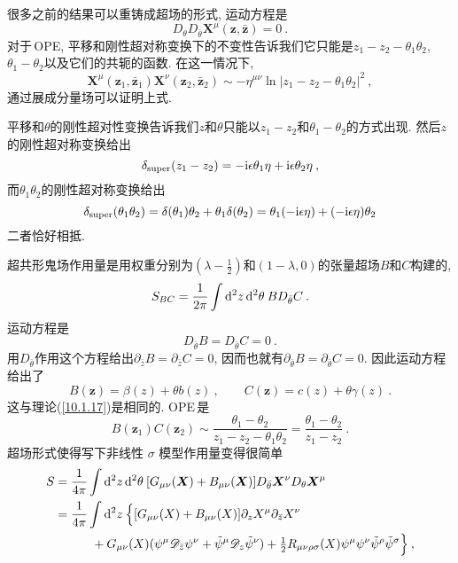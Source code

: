 很多之前的结果可以重铸成超场的形式, 运动方程是
\begin{equation}
    D_{\theta}D_{\bar{\theta}}\bm{X}^{\mu}(\bm{z},\bar{\bm{z}})=0\:. \label{12.3.21}
\end{equation}
对于\,OPE, 平移和刚性超对称变换下的不变性告诉我们它只能是$ z_{1}-z_{2}-\theta_{1}\theta_{2}$, $\theta_{1}-\theta_{2} $以及它们的共轭的函数. 在这一情况下,
\begin{equation}
    \bm{X}^{\mu}(\bm{z}_{1},\bar{\bm{z}}_{1})\bm{X}^{\nu}(\bm{z}_{2},\bar{\bm{z}}_{2})\sim
    -\eta^{\mu\nu}\ln\lvert z_{1}-z_{2}-\theta_{1}\theta_{2}\rvert^{2} \:, \label{12.3.22}
\end{equation}
通过展成分量场可以证明上式.
\begin{tcolorbox}
平移和$ \theta $的刚性超对性变换告诉我们$ z $和$ \theta $只能以$ z_{1}-z_{2} $和$ \theta_{1}-\theta_{2} $的方式出现. 然后$ z $的刚性超对称变换给出
\[
\delta_{\text{super}}(z_{1}-z_{2}) = -\mathrm{i}\epsilon\theta_{1}\eta+\mathrm{i}\epsilon\theta_{2}\eta \:,
\]
而$ \theta_{1}\theta_{2} $的刚性超对称变换给出
\[
\delta_{\text{super}}(\theta_{1}\theta_{2})= \delta(\theta_{1})\theta_{2}+\theta_{1}\delta(\theta_{2})
=\theta_{1}(-\mathrm{i}\epsilon\eta)+(-\mathrm{i}\epsilon\eta)\theta_{2}
\]
二者恰好相抵.
\end{tcolorbox}
超共形鬼场作用量是用权重分别为$ (\lambda-\frac{1}{2}) $和$ (1-\lambda,0) $的张量超场$ B $和$ C $构建的,
\begin{equation}
    S_{BC}=\frac{1}{2\pi}\int \mathrm{d}^{2}z\,\mathrm{d}^{2}\theta\: B D_{\bar{\theta}}C \:. \label{12.3.23}
\end{equation}
运动方程是
\begin{equation}
    D_{\bar{\theta}}B= D_{\bar{\theta}}C=0 \:. \label{12.3.24}
\end{equation}
用$ D_{\bar{\theta}} $作用这个方程给出$ \partial_{\bar{z}}B=\partial_{\bar{z}}C=0$, 因而也就有$ \partial_{\bar{\theta}}B=\partial_{\bar{\theta}}C=0$. 因此运动方程给出了
\begin{equation}
    B(\bm{z})=\beta(z)+\theta b(z) \:, \qquad C(\bm{z})=c(z)+\theta\gamma(z)\:. \label{12.3.25}
\end{equation}
这与理论(\ref{10.1.17})是相同的. OPE\,是
\begin{equation}
    B(\bm{z}_{1})C(\bm{z}_{2})\sim \frac{\theta_{1}-\theta_{2}}{z_{1}-z_{2}-\theta_{1}\theta_{2}}
    =\frac{\theta_{1}-\theta_{2}}{z_{1}-z_{2}} \:. \label{12.3.26}
\end{equation}
超场形式使得写下非线性 $\sigma$ 模型作用量变得很简单
\begin{align}
    S &= \frac{1}{4\pi}\int\mathrm{d}^{2}z\,\mathrm{d}^{2}\theta\:[G_{\mu\nu}(\bm{X})+B_{\mu\nu}(\bm{X})]
    D_{\bar{\theta}}\bm{X}^{\nu}D_{\theta}\bm{X}^{\mu} \nonumber \\ 
    &=\frac{1}{4\pi}\int \mathrm{d}^{2}z\:\Bigl\{[G_{\mu\nu}(X)+B_{\mu\nu}(X)]\partial_{z}X^{\mu}\partial_{\bar{z}}X^{\nu}
    \nonumber \\
    &\qquad \quad+G_{\mu\nu}(X)(\psi^{\mu}\mathscr{D}_{\bar{z}}\psi^{\nu}+\tilde{\psi}^{\mu}\mathscr{D}_{z}\tilde{\psi}^{\nu})+\tfrac{1}{2}R_{\mu\nu\rho\sigma}(X)\psi^{\mu}\psi^{\nu}\tilde{\psi}^{\rho}\tilde{\psi}^{\sigma}\Bigr\}\:,
    \label{12.3.27}
\end{align}
